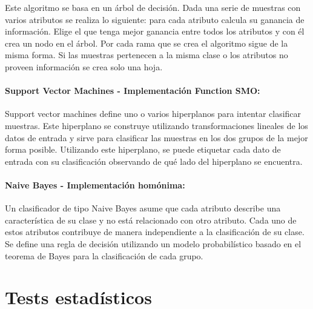 
Este algoritmo se basa en un árbol de decisión. Dada una serie de muestras con varios atributos se realiza lo siguiente: para cada atributo calcula su ganancia de información. Elige el que tenga mejor ganancia entre todos los atributos y con él crea un nodo en el árbol. Por cada rama que se crea el algoritmo sigue de la misma forma. Si las muestras pertenecen a la misma clase o los atributos no proveen información se crea solo una hoja.

\paragraph{Support Vector Machines \cite{Platt98sequentialminimal} - Implementación Function SMO:}


Support vector machines define uno o varios hiperplanos para intentar clasificar muestras. Este hiperplano se construye utilizando transformaciones lineales de los datos de entrada y sirve para clasificar las muestras en los dos grupos de la mejor forma posible. Utilizando este hiperplano, se puede etiquetar cada dato de entrada con su clasificación observando de qué lado del hiperplano se encuentra.

\paragraph{Naive Bayes \cite{DBLP:conf/flairs/Zhang04} - Implementación homónima:}


Un clasificador de tipo Naive Bayes asume que cada atributo describe una característica de su clase y no está relacionado con otro atributo. Cada uno de estos atributos contribuye de manera independiente a la clasificación de su clase. Se define una regla de decisión utilizando un modelo probabilístico basado en el teorema de Bayes para la clasificación de cada grupo.

\section{Tests estadísticos}

